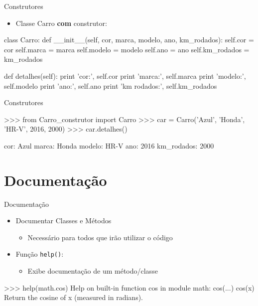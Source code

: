 \documentclass{beamer}
\begin{document}
\begin{frame}[fragile]{Construtores}
    \begin{itemize}
        \item Classe Carro \textbf{com} construtor:
    \end{itemize}
    \small
    \begin{semiverbatim}
    class Carro:
        def __init__(self, cor, marca, modelo, ano, km_rodados):
            self.cor = cor
            self.marca = marca
            self.modelo = modelo
            self.ano = ano
            self.km_rodados = km_rodados
    
        def detalhes(self):
            print 'cor:', self.cor
            print 'marca:', self.marca
            print 'modelo:', self.modelo
            print 'ano:', self.ano
            print 'km rodados:', self.km_rodados
    \end{semiverbatim}
\end{frame}

\begin{frame}[fragile]{Construtores}
    \small
    \begin{semiverbatim}
    >>> from Carro_construtor import Carro
    >>> car = Carro('Azul', 'Honda', 'HR-V', 2016, 2000)
    >>> car.detalhes()
    
    cor: Azul
    marca: Honda
    modelo: HR-V
    ano: 2016
    km_rodados: 2000
    \end{semiverbatim}
\end{frame}

\section{Documentação}

\begin{frame}[fragile]{Documentação}
    \begin{itemize}
        \item Documentar Classes e Métodos
        \begin{itemize}
            \item Necessário para todos que irão utilizar o código
        \end{itemize}
        \item Função \texttt{help()}:
        \begin{itemize}
            \item Exibe documentação de um método/classe
        \end{itemize}
    \end{itemize}
    \small
    \begin{semiverbatim}
    >>> help(math.cos)
    Help on built-in function cos in module math:
    cos(...)
        cos(x)
        Return the cosine of x (measured in radians).
    \end{semiverbatim}
\end{frame}
\end{document}
